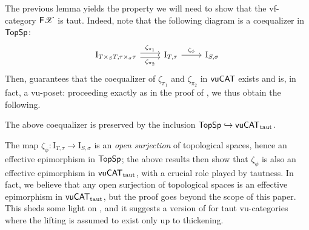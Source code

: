 The previous lemma yields the property we will need to show that the vf-category $\mathsf F \mathscr{X}$ is taut. Indeed, note that the following diagram is a coequalizer in $\mathsf{TopSp}$:
\[\begin{tikzcd}
        {\mathrm{I}_{T \times_S T , \tau \times_\sigma \tau}} & {\mathrm I_{T,\tau}} & {\mathrm I_{S,\sigma}}
        \arrow["{\zeta_{\pi_1}}", shift left, from=1-1, to=1-2]
        \arrow["{\zeta_{\pi_2}}"', shift right, from=1-1, to=1-2]
        \arrow["{\zeta_{\phi}}", from=1-2, to=1-3]
    \end{tikzcd}\]
Then,  guarantees that the coequalizer of $\zeta_{\pi_1}$ and $\zeta_{\pi_2}$ in $\mathsf{vuCAT}$ exists and is, in fact, a vu-poset: proceeding exactly as in the proof of , we thus obtain the following.


\begin{cor}\label{cor:lem:I-S-sigma-is-coequalizer}
   The above coequalizer is preserved by the inclusion $\mathsf{TopSp} \hookrightarrow \mathsf{vuCAT}_{\mathrm{taut}}$.
   
\end{cor}

\begin{rmk}
The map $\zeta_\phi\colon \mathrm I_{T,\tau}\to\mathrm I_{S,\sigma}$ is an \emph{open surjection} of topological spaces, hence an effective epimorphism in $\mathsf{TopSp}$; the above results then show that $\zeta_\phi$ is also an effective epimorphism in $\mathsf{vuCAT}_{\mathrm{taut}}$, with a crucial role played by tautness. In fact, we believe that any open surjection of topological spaces is an effective epimorphism in $\mathsf{vuCAT}_{\mathrm{taut}}$, but the proof goes beyond the scope of this paper. This sheds some light on \cite[Rem.\ 7.14]{saadiaExtendingConceptualCompleteness2026}, and it suggests a version of \cite[Prop.\ 7.13]{saadiaExtendingConceptualCompleteness2026} for taut vu-categories where the lifting is assumed to exist only up to thickening.


\end{rmk}

